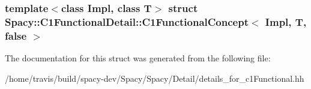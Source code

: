 \subsubsection*{template$<$class Impl, class T$>$ struct Spacy\-::\-C1\-Functional\-Detail\-::\-C1\-Functional\-Concept$<$ Impl, T, false $>$}



\-The documentation for this struct was generated from the following file\-:\begin{DoxyCompactItemize}
\item 
/home/travis/build/spacy-\/dev/\-Spacy/\-Spacy/\-Detail/details\-\_\-for\-\_\-c1\-Functional.\-hh\end{DoxyCompactItemize}
